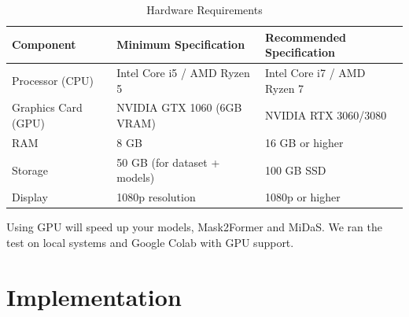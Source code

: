 \documentclass[12pt,a4paper]{report}
\theoremstyle{definition}
\theoremstyle{remark}
\begin{document}
\begin{table}[h!]
\centering
\begin{tabular}{|l|l|l|}
\hline
\textbf{Component} & \textbf{Minimum Specification} & \textbf{Recommended Specification} \\
\hline
Processor (CPU) & Intel Core i5 / AMD Ryzen 5 & Intel Core i7 / AMD Ryzen 7 \\
\hline
Graphics Card (GPU) & NVIDIA GTX 1060 (6GB VRAM) & NVIDIA RTX 3060/3080 \\
\hline
RAM & 8 GB & 16 GB or higher \\
\hline
Storage & 50 GB (for dataset + models) & 100 GB SSD \\
\hline
Display & 1080p resolution & 1080p or higher \\
\hline
\end{tabular}
\caption{Hardware Requirements}
\label{tab:hard}
\end{table}

\vspace{0.5cm}
Using GPU will speed up your models, Mask2Former and MiDaS. We ran the test on local systems and Google Colab with GPU support.

\chapter{Implementation}
\end{document}
